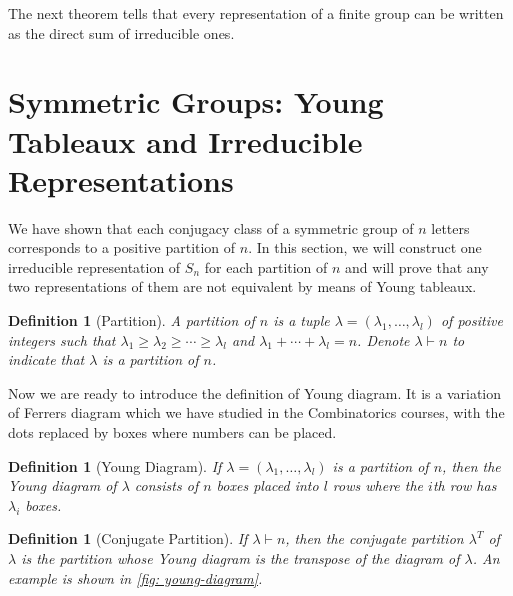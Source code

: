 \documentclass{assignment}[2019/10/15]
\theoremstyle{plain}
\newtheorem{definition}[theorem]{Definition}
\begin{document}
    The next theorem tells that every representation of a finite group can be written as the direct sum of irreducible ones.

    \section{Symmetric Groups: Young Tableaux and Irreducible Representations}

    We have shown that each conjugacy class of a symmetric group of $n$ letters corresponds to a positive partition of $n$. In this section, we will construct one irreducible representation of $S_n$ for each partition of $n$ and will prove that any two representations of them are not equivalent by means of Young tableaux.

    \begin{definition}[Partition]
        A \emph{partition} of $n$ is a tuple $\lambda = (\lambda_1, \dotsc, \lambda_l)$ of positive integers such that $\lambda_1\geq \lambda_2\geq \dotsb \geq \lambda_l$ and $\lambda_1+\dotsb + \lambda_l=n$. Denote $\lambda\vdash n$ to indicate that $\lambda$ is a partition of $n$.
    \end{definition}

    Now we are ready to introduce the definition of Young diagram. It is a variation of Ferrers diagram which we have studied in the Combinatorics courses, with the dots replaced by boxes where numbers can be placed.

    \begin{definition}[Young Diagram]
        If $\lambda = (\lambda_1, \dotsc, \lambda_l)$ is a partition of $n$, then the \emph{Young diagram} of $\lambda$ consists of $n$ boxes placed into $l$ rows where the $i$th row has $\lambda_i$ boxes.
    \end{definition}

    \begin{definition}[Conjugate Partition]
        If $\lambda\vdash n$, then the \emph{conjugate partition} $\lambda^T$ of $\lambda$ is the partition whose Young diagram is the transpose of the diagram of $\lambda$. An example is shown in \ref{fig: young-diagram}.
    \end{definition}
\end{document}
